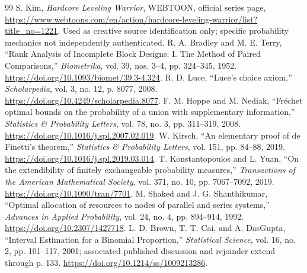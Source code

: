 \documentclass[11pt,a4paper]{article}
\begin{document}
\begin{thebibliography}{99}
 S. Kim, \emph{Hardcore Leveling Warrior}, WEBTOON, official series page, \url{https://www.webtoons.com/en/action/hardcore-leveling-warrior/list?title_no=1221}. Used as creative source identification only; specific probability mechanics not independently authenticated.
 R. A. Bradley and M. E. Terry, ``Rank Analysis of Incomplete Block Designs: I. The Method of Paired Comparisons,'' \emph{Biometrika}, vol. 39, nos. 3--4, pp. 324--345, 1952. \url{https://doi.org/10.1093/biomet/39.3-4.324}.
 R. D. Luce, ``Luce's choice axiom,'' \emph{Scholarpedia}, vol. 3, no. 12, p. 8077, 2008. \url{https://doi.org/10.4249/scholarpedia.8077}.
 F. M. Hoppe and M. Nediak, ``Fr\'echet optimal bounds on the probability of a union with supplementary information,'' \emph{Statistics \& Probability Letters}, vol. 78, no. 3, pp. 311--319, 2008. \url{https://doi.org/10.1016/j.spl.2007.02.019}.
 W. Kirsch, ``An elementary proof of de Finetti's theorem,'' \emph{Statistics \& Probability Letters}, vol. 151, pp. 84--88, 2019. \url{https://doi.org/10.1016/j.spl.2019.03.014}.
 T. Konstantopoulos and L. Yuan, ``On the extendibility of finitely exchangeable probability measures,'' \emph{Transactions of the American Mathematical Society}, vol. 371, no. 10, pp. 7067--7092, 2019. \url{https://doi.org/10.1090/tran/7701}.
 M. Shaked and J. G. Shanthikumar, ``Optimal allocation of resources to nodes of parallel and series systems,'' \emph{Advances in Applied Probability}, vol. 24, no. 4, pp. 894--914, 1992. \url{https://doi.org/10.2307/1427718}.
 L. D. Brown, T. T. Cai, and A. DasGupta, ``Interval Estimation for a Binomial Proportion,'' \emph{Statistical Science}, vol. 16, no. 2, pp. 101--117, 2001; associated published discussion and rejoinder extend through p. 133. \url{https://doi.org/10.1214/ss/1009213286}.
\end{thebibliography}
\end{document}
